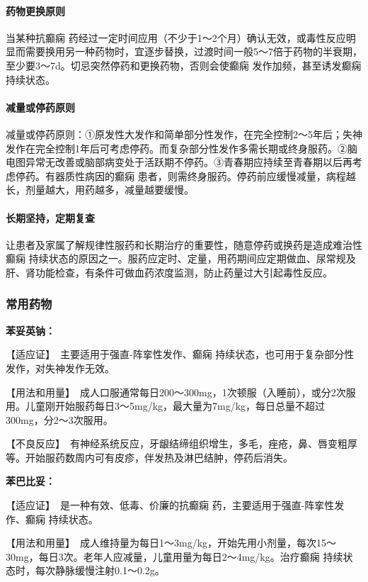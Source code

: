\paragraph{药物更换原则}

当某种抗癫痫
药经过一定时间应用（不少于1～2个月）确认无效，或毒性反应明显而需要换用另一种药物时，宜逐步替换，过渡时间一般5～7倍于药物的半衰期，至少要3～7d。切忌突然停药和更换药物，否则会使癫痫
发作加频，甚至诱发癫痫 持续状态。
\paragraph{减量或停药原则}

减量或停药原则：①原发性大发作和简单部分性发作，在完全控制2～5年后；失神发作在完全控制1年后可考虑停药。而复杂部分性发作多需长期或终身服药。②脑电图异常无改善或脑部病变处于活跃期不停药。③青春期应持续至青春期以后再考虑停药。有器质性病因的癫痫
患者，则需终身服药。停药前应缓慢减量，病程越长，剂量越大，用药越多，减量越要缓慢。
\paragraph{长期坚持，定期复查}

让患者及家属了解规律性服药和长期治疗的重要性，随意停药或换药是造成难治性癫痫
持续状态的原因之一。服药应定时、定量，用药期间应定期做血、尿常规及肝、肾功能检查，有条件可做血药浓度监测，防止药量过大引起毒性反应。

\subsubsection{常用药物}

\textbf{苯妥英钠：}

【适应证】　主要适用于强直-阵挛性发作、癫痫
持续状态，也可用于复杂部分性发作，对失神发作无效。

【用法和用量】　成人口服通常每日200～300mg，1次顿服（入睡前），或分2次服用。儿童刚开始服药每日3～5mg/kg，最大量为7mg/kg，每日总量不超过300mg，分2～3次服用。

【不良反应】　有神经系统反应，牙龈结缔组织增生，多毛，痤疮，鼻、唇变粗厚等。开始服药数周内可有皮疹，伴发热及淋巴结肿，停药后消失。

\textbf{苯巴比妥：}

【适应证】　是一种有效、低毒、价廉的抗癫痫
药，主要适用于强直-阵挛性发作、癫痫
持续状态。

【用法和用量】　成人维持量为每日1～3mg/kg，开始先用小剂量，每次15～30mg，每日3次。老年人应减量，儿童用量为每日2～4mg/kg。治疗癫痫
持续状态时，每次静脉缓慢注射0.1～0.2g。

